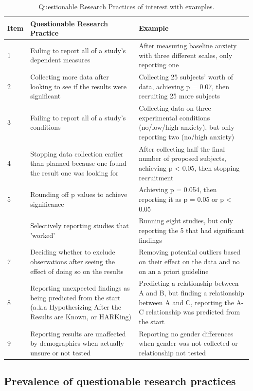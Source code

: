\documentclass[jou]{apa6}
\theoremstyle{definition}
\theoremstyle{definition}
\theoremstyle{definition}
\theoremstyle{remark}
\begin{document}
\begin{table}

\caption{\label{tab:QRPs}Questionable Research Practices of interest with examples.}
\centering
\fontsize{9}{11}\selectfont
\begin{tabular}[t]{l>{\raggedright\arraybackslash}p{20em}>{\raggedright\arraybackslash}p{20em}}
\toprule
Item & Questionable Research Practice & Example\\
\midrule
1 & Failing to report all of a study's dependent measures & After measuring baseline anxiety with three different scales, only reporting one\\
2 & Collecting more data after looking to see if the results were significant & Collecting 25 subjects' worth of data, achieving p = 0.07, then recruiting 25 more subjects\\
3 & Failing to report all of a study's conditions & Collecting data on three experimental conditions (no/low/high anxiety), but only reporting two (no/high anxiety)\\
4 & Stopping data collection earlier than planned because one found the result one was looking for & After collecting half the final number of proposed subjects, achieving p < 0.05, then stopping recruitment\\
5 & Rounding off p values to achieve significance & Achieving p = 0.054, then reporting it as p = 0.05 or p < 0.05\\
\addlinespace
6 & Selectively reporting studies that 'worked' & Running eight studies, but only reporting the 5 that had significant findings\\
7 & Deciding whether to exclude observations after seeing the effect of doing so on the results & Removing potential outliers based on their effect on the data and no on an a priori guideline\\
8 & Reporting unexpected findings as being predicted from the start (a.k.a Hypothesizing After the Results are Known, or HARKing) & Predicting a relationship between A and B, but finding a relationship between A and C, reporting the A-C relationship was predicted from the start\\
9 & Reporting results are unaffected by demographics when actually unsure or not tested & Reporting no gender differences when gender was not collected or relationship not tested\\
\bottomrule
\end{tabular}
\end{table}

\subsection{Prevalence of questionable research
practices}\label{prevalence-of-questionable-research-practices}
\end{document}
